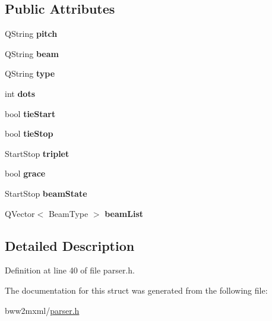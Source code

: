 \subsection*{Public Attributes}
\begin{DoxyCompactItemize}
\item 
\mbox{\label{struct_bww_1_1_note_description_afd8e02ef58148a79cf920e395a50fe5b}} 
Q\+String {\bfseries pitch}
\item 
\mbox{\label{struct_bww_1_1_note_description_a264c76894b562062ef3036a4663ef9eb}} 
Q\+String {\bfseries beam}
\item 
\mbox{\label{struct_bww_1_1_note_description_a3be5d55f6855a6dd4d19974060d04958}} 
Q\+String {\bfseries type}
\item 
\mbox{\label{struct_bww_1_1_note_description_a42f9baa2afa7b521e8d28bd5915b37ef}} 
int {\bfseries dots}
\item 
\mbox{\label{struct_bww_1_1_note_description_a3426bc16ad477fcecc97e88e9668a2c0}} 
bool {\bfseries tie\+Start}
\item 
\mbox{\label{struct_bww_1_1_note_description_a88e6887a9dee89e72654f190ad2c403a}} 
bool {\bfseries tie\+Stop}
\item 
\mbox{\label{struct_bww_1_1_note_description_ae038335e79ab851162122e764fba1af4}} 
Start\+Stop {\bfseries triplet}
\item 
\mbox{\label{struct_bww_1_1_note_description_a3eda6ee6c871f55533d41ab399522c8d}} 
bool {\bfseries grace}
\item 
\mbox{\label{struct_bww_1_1_note_description_a20a989a3109c77a9609f48b6bcd5277b}} 
Start\+Stop {\bfseries beam\+State}
\item 
\mbox{\label{struct_bww_1_1_note_description_a5aeceeebf420caccbb472f06416a9231}} 
Q\+Vector$<$ Beam\+Type $>$ {\bfseries beam\+List}
\end{DoxyCompactItemize}


\subsection{Detailed Description}


Definition at line 40 of file parser.\+h.



The documentation for this struct was generated from the following file\+:\begin{DoxyCompactItemize}
\item 
bww2mxml/\hyperlink{bww2mxml_2parser_8h}{parser.\+h}\end{DoxyCompactItemize}
